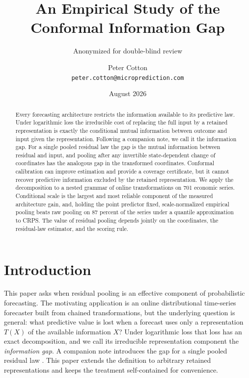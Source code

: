 \documentclass[11pt]{article}
\title{An Empirical Study of the Conformal Information Gap}
\author{Anonymized for double-blind review}
\author{Peter Cotton\\\texttt{peter.cotton@microprediction.com}}
\date{August 2026}
\theoremstyle{remark}
\newif\ifanon
\begin{document}
\maketitle

\begin{abstract}
Every forecasting architecture restricts the information available to its predictive law.
Under logarithmic loss the irreducible cost of replacing the full input by a retained
representation is exactly the conditional mutual information between outcome and input given
the representation. Following a companion note, we call it the information gap. For a single pooled residual law the gap
is the mutual information between residual and input, and pooling after any invertible
state-dependent change of coordinates has the analogous gap in the transformed coordinates.
Conformal calibration can improve estimation and provide a coverage certificate, but it
cannot recover predictive information excluded by the retained representation. We apply the decomposition to a
nested grammar of online transformations on 701 economic series. Conditional scale is the
largest and most reliable component of the measured architecture gain, and, holding the point
predictor fixed, scale-normalized empirical pooling beats raw pooling on 87 percent of the
series under a quantile approximation to CRPS. The value of residual pooling depends jointly
on the coordinates, the residual-law estimator, and the scoring rule.
\end{abstract}

\section{Introduction}\label{sec:intro}

This paper asks when residual pooling is an effective component of probabilistic
forecasting. The motivating application is an online distributional time-series forecaster
built from chained transformations, but the underlying question is general: what predictive
value is lost when a forecast uses only a representation $T(X)$ of the available information
$X$? Under logarithmic loss that loss has an exact decomposition, and we call its irreducible
representation component the \emph{information gap}. \ifanon A recent note, blinded for
review, introduces the gap for a single pooled residual law. \else A companion note
introduces the gap for a single pooled residual law \citep{cotton2026marginally}. \fi This
paper extends the definition to arbitrary retained representations and keeps the treatment
self-contained for convenience.
\end{document}
